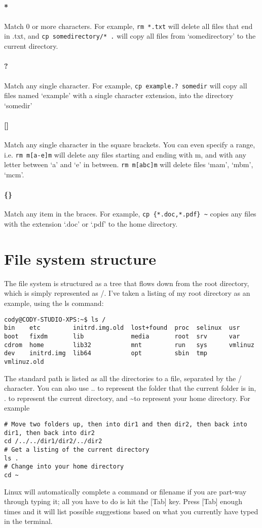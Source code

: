 \documentclass{article}
\begin{document}
\paragraph{*}
Match 0 or more characters. For example, \texttt{rm *.txt} will delete all files that end in .txt, and \texttt{cp somedirectory/* .} will copy all files from `somedirectory' to the current directory.
\paragraph{?}
Match any single character. For example, \texttt{cp example.? somedir} will copy all files named `example' with a single character extension, into the directory `somedir' 
\paragraph{[]}
Match any single character in the square brackets. You can even specify a range, i.e. \texttt{rm m[a-e]m} will delete any files starting and ending with m, and with any letter between `a' and `e' in between. \texttt{rm m[abc]m} will delete files `mam', `mbm', `mcm'.
\paragraph{\{\}}
Match any item in the braces. For example, \texttt{cp \{*.doc,*.pdf\} \textasciitilde} copies any files with the extension `.doc' or `.pdf' to the home directory.


\section{File system structure}
The file system is structured as a tree that flows down from the root directory, which is simply represented as /. I've taken a listing of my root directory as an example, using the ls command:
\begin{verbatim}
cody@CODY-STUDIO-XPS:~$ ls /
bin    etc         initrd.img.old  lost+found  proc  selinux  usr
boot   fixdm       lib             media       root  srv      var
cdrom  home        lib32           mnt         run   sys      vmlinuz
dev    initrd.img  lib64           opt         sbin  tmp      vmlinuz.old
\end{verbatim}
The standard path is listed as all the directories to a file, separated by the / character.
You can also use .. to represent the folder that the current folder is in, . to represent the current directory, and \textasciitilde to represent your home directory. For example
\begin{verbatim}
# Move two folders up, then into dir1 and then dir2, then back into dir1, then back into dir2
cd /../../dir1/dir2/../dir2
# Get a listing of the current directory
ls .
# Change into your home directory
cd ~
\end{verbatim}
Linux will automatically complete a command or filename if you are part-way through typing it; all you have to do is hit the [Tab] key. Press [Tab] enough times and it will list possible suggestions based on what you currently have typed in the terminal.
\end{document}
